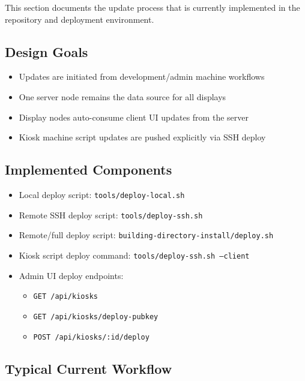 \documentclass[11pt,letterpaper]{article}
\begin{document}
This section documents the update process that is currently implemented in the repository and deployment environment.

\subsection{Design Goals}

\begin{itemize}
\item Updates are initiated from development/admin machine workflows
\item One server node remains the data source for all displays
\item Display nodes auto-consume client UI updates from the server
\item Kiosk machine script updates are pushed explicitly via SSH deploy
\end{itemize}

\subsection{Implemented Components}

\begin{itemize}
\item Local deploy script: \texttt{tools/deploy-local.sh}
\item Remote SSH deploy script: \texttt{tools/deploy-ssh.sh}
\item Remote/full deploy script: \texttt{building-directory-install/deploy.sh}
\item Kiosk script deploy command: \texttt{tools/deploy-ssh.sh --client}
\item Admin UI deploy endpoints:
\begin{itemize}
\item \texttt{GET /api/kiosks}
\item \texttt{GET /api/kiosks/deploy-pubkey}
\item \texttt{POST /api/kiosks/:id/deploy}
\end{itemize}
\end{itemize}

\subsection{Typical Current Workflow}
\end{document}

